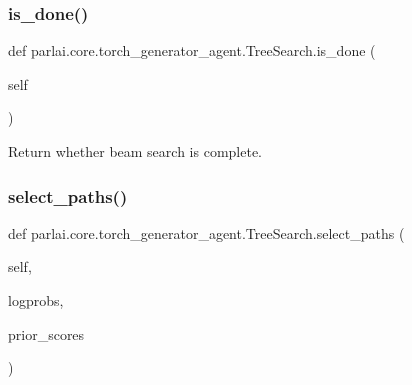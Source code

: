 \subsubsection{\texorpdfstring{is\+\_\+done()}{is\_done()}}
{\footnotesize\ttfamily def parlai.\+core.\+torch\+\_\+generator\+\_\+agent.\+Tree\+Search.\+is\+\_\+done (\begin{DoxyParamCaption}\item[{}]{self }\end{DoxyParamCaption})}

\begin{DoxyVerb}Return whether beam search is complete.
\end{DoxyVerb}
 \mbox{\label{classparlai_1_1core_1_1torch__generator__agent_1_1TreeSearch_a004609539d0428a9351a991168eb370b}} 
\subsubsection{\texorpdfstring{select\+\_\+paths()}{select\_paths()}}
{\footnotesize\ttfamily def parlai.\+core.\+torch\+\_\+generator\+\_\+agent.\+Tree\+Search.\+select\+\_\+paths (\begin{DoxyParamCaption}\item[{}]{self,  }\item[{}]{logprobs,  }\item[{}]{prior\+\_\+scores }\end{DoxyParamCaption})}

